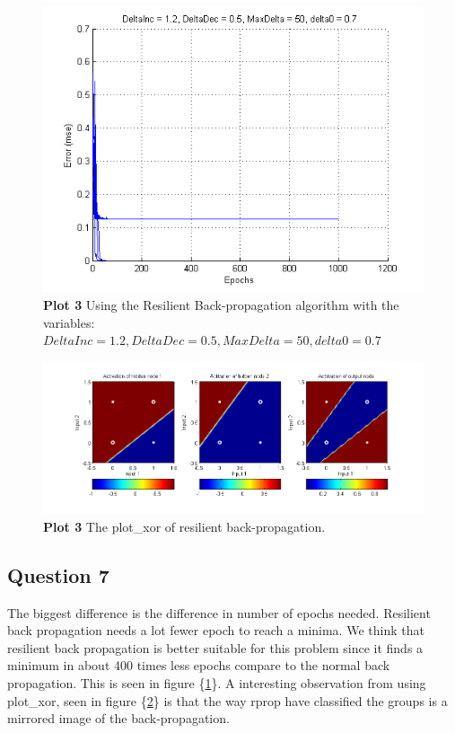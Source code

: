 \documentclass[a4paper]{article}
\begin{document}
\begin{figure}[H] %
	\includegraphics[]{plot3_rprop.png}
	\caption{\label{fig:plot3_rprop}\textbf{Plot 3} Using the Resilient Back-propagation algorithm with the variables: $DeltaInc = 1.2, DeltaDec = 0.5, MaxDelta = 50, delta0 = 0.7$}
\end{figure}
\begin{figure}[H] %
	\includegraphics[scale=0.55]{good_rprop_xor_plot.png}
	\caption{\label{fig:good_rprop_xor_plot}\textbf{Plot 3} The plot\_xor of resilient back-propagation.}
\end{figure}
\subsection*{Question 7}
The biggest difference is the difference in number of epochs needed. 
Resilient back propagation needs a lot fewer epoch to reach a minima.
We think that resilient back propagation is better suitable for this problem 
since it finds a minimum in about 400 times less epochs compare to the normal 
back propagation. This is seen in figure \{\ref{fig:plot3_rprop}\}.
A interesting observation from using plot\_xor, seen in figure \{\ref{fig:good_rprop_xor_plot}\} is that the way rprop have classified the groups is a mirrored image of the back-propagation. 
\end{document}
